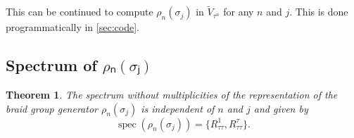 \documentclass[a4paper,10pt,oneside]{book}
\theoremstyle{plain}
\newtheorem{theorem}{Theorem}[section]
\theoremstyle{definition}
\theoremstyle{remark}
\newtheorem{remark}{Remark}[section]
\begin{document}
This can be continued to compute $ρ_n(σ_j)$ in $\widetilde{V}_{τ^n}$ for any $n$ and $j$. This is done programmatically in \cref{sec:code}.










\subsection{Spectrum of \texorpdfstring{$ρₙ(σⱼ)$}{ρₙ(σⱼ)}}

\begin{theorem}
  The spectrum without multiplicities of the representation of the braid group generator $ρ_n(σ_j)$ is independent of $n$ and $j$ and given by
  \begin{equation}
    \operatorname{spec}(ρ_n(σ_j)) = \big\{ R_{\tau\tau}^1, R_{\tau\tau}^\tau \big\}.
  \end{equation}
\end{theorem}
\end{document}
